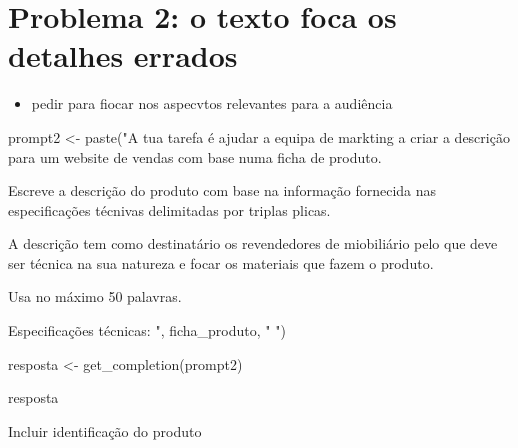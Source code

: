 \documentclass[
  letterpaper,
  paper=6in:9in,
  pagesize=pdftex,
  headinclude=on,
  footinclude=on,
  12pt]{scrbook}
\newenvironment{Shaded}{\begin{snugshade}}{\end{snugshade}}
\newcommand{\FunctionTok}[1]{\textcolor[rgb]{0.28,0.35,0.67}{#1}}
\newcommand{\NormalTok}[1]{\textcolor[rgb]{0.00,0.23,0.31}{#1}}
\newcommand{\OtherTok}[1]{\textcolor[rgb]{0.00,0.23,0.31}{#1}}
\newcommand{\StringTok}[1]{\textcolor[rgb]{0.13,0.47,0.30}{#1}}
\providecommand{\tightlist}{%
  \setlength{\itemsep}{0pt}\setlength{\parskip}{0pt}}\usepackage{longtable,booktabs,array}
\begin{document}
\hypertarget{problema-2-o-texto-foca-os-detalhes-errados}{%
\section{Problema 2: o texto foca os detalhes
errados}\label{problema-2-o-texto-foca-os-detalhes-errados}}

\begin{itemize}
\tightlist
\item
  pedir para fiocar nos aspecvtos relevantes para a audiência
\end{itemize}

\begin{Shaded}
\begin{Highlighting}[]
\NormalTok{prompt2 }\OtherTok{\textless{}{-}} \FunctionTok{paste}\NormalTok{(}\StringTok{"A tua tarefa é ajudar a equipa de markting a criar a descrição }
\StringTok{para um website de vendas com base numa ficha de produto.}

\StringTok{Escreve a descrição do produto com base na informação fornecida }
\StringTok{nas especificações técnivas delimitadas por triplas plicas.}

\StringTok{A descrição tem como destinatário os revendedores de miobiliário pelo que deve ser técnica}
\StringTok{na sua natureza e focar os materiais que fazem o produto.}

\StringTok{Usa no máximo 50 palavras.}

\StringTok{Especificações técnicas: \textquotesingle{}\textquotesingle{}\textquotesingle{} "}\NormalTok{, ficha\_produto, }\StringTok{"\textquotesingle{}\textquotesingle{}\textquotesingle{} "}\NormalTok{)}

\NormalTok{resposta }\OtherTok{\textless{}{-}} \FunctionTok{get\_completion}\NormalTok{(prompt2)}

\NormalTok{resposta}
\end{Highlighting}
\end{Shaded}

Incluir identificação do produto
\end{document}
